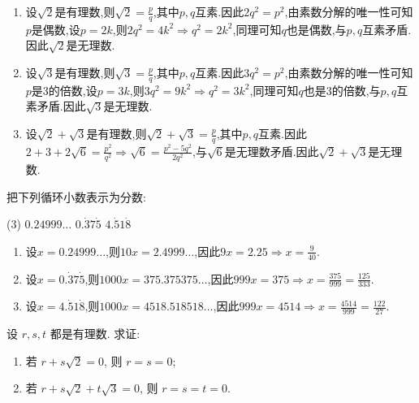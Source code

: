 \begin{solution}
    \begin{enumerate}[(1)]
        \item 设$\sqrt{2}$是有理数,则$\sqrt{2} = \frac{p}{q}$,其中$p,q$互素.因此$2q^2 = p^2$,由素数分解的唯一性可知$p$是偶数,设$p=2k$,则$2q^2 = 4k^2 \Rightarrow q^2 = 2k^2$,同理可知$q$也是偶数,与$p,q$互素矛盾.因此$\sqrt{2}$是无理数.
        \item 设$\sqrt{3}$是有理数,则$\sqrt{3} = \frac{p}{q}$,其中$p,q$互素.因此$3q^2 = p^2$,由素数分解的唯一性可知$p$是3的倍数,设$p=3k$,则$3q^2 = 9k^2 \Rightarrow q^2 = 3k^2$,同理可知$q$也是3的倍数,与$p,q$互素矛盾.因此$\sqrt{3}$是无理数.
        \item 设$\sqrt{2} + \sqrt{3}$是有理数,则$\sqrt{2} + \sqrt{3} = \frac{p}{q}$,其中$p,q$互素.因此$2 + 3 + 2\sqrt{6} = \frac{p^2}{q^2} \Rightarrow \sqrt{6} = \frac{p^2 - 5q^2}{2q^2}$,与$\sqrt{6}$是无理数矛盾.因此$\sqrt{2} + \sqrt{3}$是无理数.
    \end{enumerate}
\end{solution}

\begin{exercise}[1.1.4]
    把下列循环小数表示为分数:
    \begin{tasks}[label=(\arabic*)](3)
        \task $0.24999\dots$
        \task $0.\dot{3}7\dot{5}$
        \task $4.\dot{5}1\dot{8}$
    \end{tasks}
\end{exercise}

\begin{solution}
    \begin{enumerate}[(1)]
        \item 设$x = 0.24999\dots$,则$10x = 2.4999\dots$,因此$9x = 2.25 \Rightarrow x = \frac{9}{40}$.
        \item 设$x = 0.\dot{3}7\dot{5}$,则$1000x = 375.375375\dots$,因此$999x = 375 \Rightarrow x = \frac{375}{999}=\frac{125}{333}$.
        \item 设$x = 4.\dot{5}1\dot{8}$,则$1000x = 4518.518518\dots$,因此$999x = 4514 \Rightarrow x = \frac{4514}{999}=\frac{122}{27}$.
    \end{enumerate}
\end{solution}

\begin{exercise}[1.1.5]
    设 $r,s,t$ 都是有理数. 求证:
    \begin{enumerate}
        \item 若 $r+s\sqrt{2}=0$, 则 $r=s=0$;
        \item 若 $r+s\sqrt{2}+t\sqrt{3}=0$, 则 $r=s=t=0$.
    \end{enumerate}
\end{exercise}


